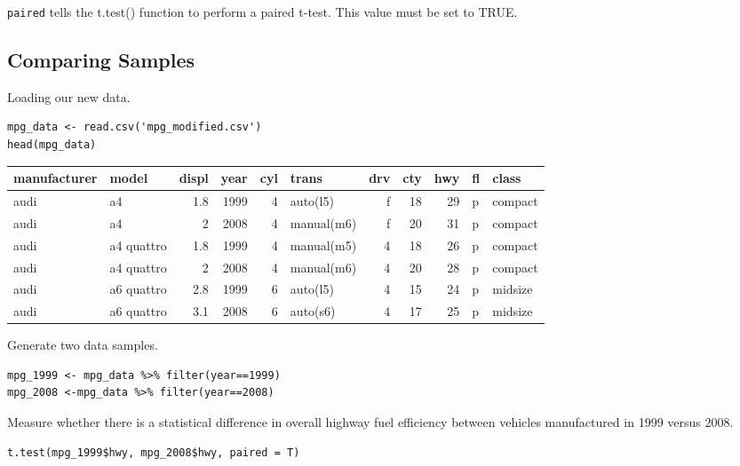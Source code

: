 \documentclass[11pt]{article}
\begin{document}
\texttt{paired} tells the t.test() function to perform a paired t-test. This value must be set to TRUE.

\subsection{Comparing Samples}
\label{sec:orga844666}

Loading our new data.

\begin{verbatim}
mpg_data <- read.csv('mpg_modified.csv')
head(mpg_data)
\end{verbatim}

\begin{org}
\begin{center}
\begin{tabular}{llrrrlrrrll}
manufacturer & model & displ & year & cyl & trans & drv & cty & hwy & fl & class\\
\hline
audi & a4 & 1.8 & 1999 & 4 & auto(l5) & f & 18 & 29 & p & compact\\
audi & a4 & 2 & 2008 & 4 & manual(m6) & f & 20 & 31 & p & compact\\
audi & a4 quattro & 1.8 & 1999 & 4 & manual(m5) & 4 & 18 & 26 & p & compact\\
audi & a4 quattro & 2 & 2008 & 4 & manual(m6) & 4 & 20 & 28 & p & compact\\
audi & a6 quattro & 2.8 & 1999 & 6 & auto(l5) & 4 & 15 & 24 & p & midsize\\
audi & a6 quattro & 3.1 & 2008 & 6 & auto(s6) & 4 & 17 & 25 & p & midsize\\
\end{tabular}
\end{center}
\end{org}

Generate two data samples.

\begin{verbatim}
mpg_1999 <- mpg_data %>% filter(year==1999)
mpg_2008 <-mpg_data %>% filter(year==2008)
\end{verbatim}

\begin{org}
\end{org}

Measure whether there is a statistical difference in overall highway fuel efficiency between vehicles manufactured in 1999 versus 2008.

\begin{verbatim}
t.test(mpg_1999$hwy, mpg_2008$hwy, paired = T)
\end{verbatim}
\end{document}
